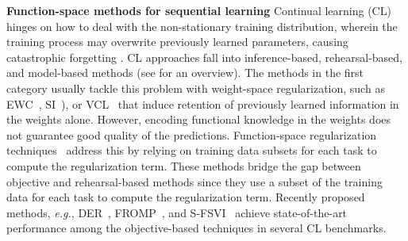 \documentclass{article}
\makeatletter
\newcommand{\eg}{\textit{e.g.\@}\xspace}
\makeatother
\begin{document}

\textbf{Function-space methods for sequential learning} 
Continual learning (CL) hinges on how to deal with the non-stationary training distribution, wherein the training process may overwrite previously learned parameters, causing catastrophic forgetting \citep{mccloskey1989catastrophic}. CL approaches fall into inference-based, rehearsal-based, and model-based methods (see \cite{parisi2019continual, de2021continual} for an overview). The methods in the first category usually tackle this problem with weight-space regularization, such as EWC~\citep{kirkpatrick2017overcoming}, SI~\citep{zenke17a}), or VCL~\citep{nguyen-tuongModel2009} that induce retention of previously learned information in the weights alone. However, encoding functional knowledge in the weights does not guarantee good quality of the predictions. Function-space regularization techniques~\cite{li2018lwf, benjamin2018measuring, titsias2019functional, buzzega2020dark, pan2020continual, rudner2022continual} address this by relying on training data subsets for each task to compute the regularization term. These methods bridge the gap between objective and rehearsal-based methods since they use a subset of the training data for each task to compute the regularization term. Recently proposed methods, \eg, DER~\citep{buzzega2020dark}, FROMP~\citep{pan2020continual}, and S-FSVI~\citep{rudner2022continual} achieve state-of-the-art performance among the objective-based techniques in several CL benchmarks. 
\end{document}
